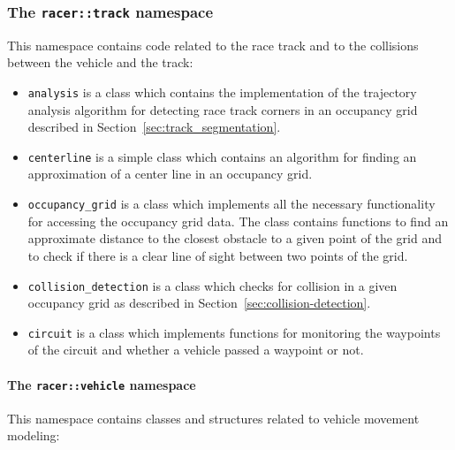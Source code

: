 \subsubsection{The \texttt{racer::track} namespace}

This namespace contains code related to the race track and to the collisions between the vehicle and the track:

\begin{itemize}
	\item \texttt{analysis} is a class which contains the implementation of the trajectory analysis algorithm for detecting race track corners in an occupancy grid described in Section~\ref{sec:track_segmentation}.

	\item \texttt{centerline} is a simple class which contains an algorithm for finding an approximation of a center line in an occupancy grid.

	\item \texttt{occupancy\_grid} is a class which implements all the necessary functionality for accessing the occupancy grid data. The class contains functions to find an approximate distance to the closest obstacle to a given point of the grid and to check if there is a clear line of sight between two points of the grid.

	\item \texttt{collision\_detection} is a class which checks for collision in a given occupancy grid as described in Section~\ref{sec:collision-detection}.

	\item \texttt{circuit} is a class which implements functions for monitoring the waypoints of the circuit and whether a vehicle passed a waypoint or not.
\end{itemize}

\paragraph{The \texttt{racer::vehicle} namespace}

This namespace contains classes and structures related to vehicle movement modeling:

